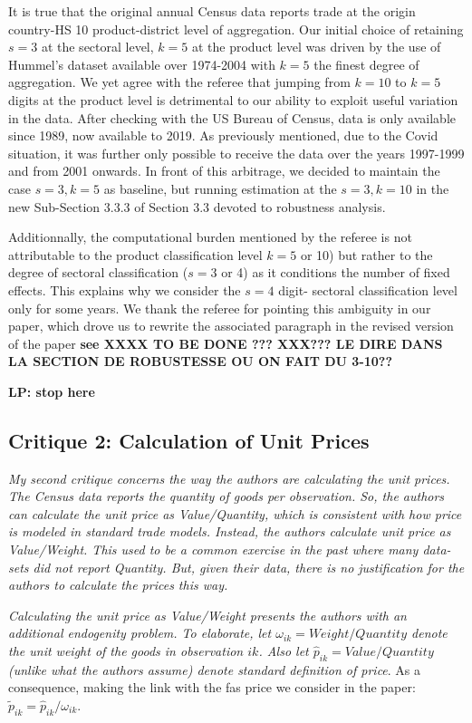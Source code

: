 \documentclass[a4paper,11pt]{article}
\begin{document}
It is true that the original annual Census data reports trade at the origin country-HS 10 product-district level of aggregation. Our initial choice of retaining $s=3$ at the sectoral level, $k=5$ at the product level was driven by the use of Hummel's dataset available over 1974-2004 with $k=5$ the finest degree of aggregation. We yet agree with the referee that jumping from $k=10$ to $k=5$ digits at the product level is detrimental to our ability to exploit useful variation in the data. After checking with the US Bureau of Census, data is only available since 1989, now available to 2019. As previously mentioned, due to the Covid situation, it was further only possible to receive the data over the years 1997-1999 and from 2001 onwards. In front of this arbitrage, we decided to maintain the case $s=3, k=5$ as baseline, but running estimation at the $s=3,k=10$ in the new Sub-Section 3.3.3 of Section 3.3 devoted to robustness analysis. 

Additionnally, the computational burden mentioned by the referee is not attributable to the product classification level $k=5$ or 10) but rather to the degree of sectoral classification ($s=3$ or 4) as it conditions the number of fixed effects. This explains why we consider the $s=4$ digit- sectoral classification level only for some years. We thank the referee for pointing this ambiguity in our paper, which drove us to rewrite the associated paragraph in the revised version of the paper \textbf{see XXXX TO BE DONE ??? XXX??? LE DIRE DANS LA SECTION DE ROBUSTESSE OU ON FAIT DU 3-10??}

\textbf{LP: stop here}

\subsection{Critique 2: Calculation of Unit Prices}

\textit{My second critique concerns the way the authors are calculating the unit prices.
The Census data reports the quantity of goods per observation. So, the authors
can calculate the unit price as Value/Quantity, which is consistent with how
price is modeled in standard trade models. Instead, the authors calculate unit
price as Value/Weight. This used to be a common exercise in the past where
many data-sets did not report Quantity. But, given their data, there is no
justification for the authors to calculate the prices this way.}

\textit{Calculating the unit price as Value/Weight presents the authors
with an additional endogenity problem. To elaborate, let $\omega_{ik} = Weight/Quantity$
denote the unit weight of the goods in observation $ik$. Also let $\widehat{p}_{ik} = Value/Quantity$
(unlike what the authors assume) denote standard definition of price}. As a consequence, making the link with the fas price we consider in the paper: $\widetilde{p}_{ik} = \widehat{p}_{ik} / \omega_{ik}$.
\end{document}
